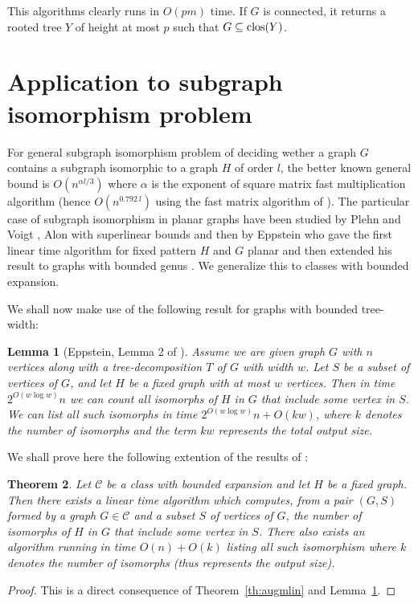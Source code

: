\documentclass[a4paper]{amsart}
\newtheorem{theorem}{Theorem}[section]
\newtheorem{lemma}[theorem]{Lemma}
\theoremstyle{definition}
\theoremstyle{remark}
\DeclareMathOperator\clos{{\rm clos}}
\begin{document}
This algorithms clearly runs in $O(pm)$ time. If $G$ is connected, it
returns a rooted tree $Y$ of height at most $p$ such that $G\subseteq\clos(Y)$.

\section{Application to subgraph isomorphism problem}
For general subgraph isomorphism problem of deciding wether a graph
$G$ contains a subgraph isomorphic to a graph $H$ of order $l$, 
the better known general bound is $O(n^{\alpha l/3})$ where $\alpha$ is
the exponent of square matrix fast multiplication algorithm
\cite{NP85} (hence $O(n^{0.792\ l})$ using the fast matrix algorithm of \cite{coppersmith90}).
 The particular case of
subgraph isomorphism in planar graphs have been studied by Plehn and
Voigt \cite{plehn91}, Alon \cite{alon95} with superlinear bounds and
then by Eppstein \cite{Epp-SODA-95}\cite{Epp-JGAA-99} who gave the
first linear time algorithm for fixed pattern $H$ and $G$ planar and
then extended his result to graphs with bounded genus \cite{Epp-Algo-00}.
We generalize this to classes with bounded expansion.

We shall now make use of the following result for graphs with bounded
tree-width: 

\begin{lemma}[Eppstein, Lemma 2 of \cite{Epp-JGAA-99}]
\label{lem:Epp2}
Assume we are given graph $G$ with $n$ vertices along with a
tree-decomposition $T$ of $G$ with width $w$. Let $S$ be a subset of
vertices of $G$, and let $H$ be a fixed graph with at most $w$
vertices. Then in time $2^{O(w\log w)}n$ we can count all isomorphs of
$H$ in $G$ that include some vertex in $S$. We can list all such
isomorphs in time  $2^{O(w\log w)}n+O(kw)$, where $k$ denotes the
number of isomorphs and the term $kw$ represents the total output
size.
\end{lemma}

We shall prove here the following extention of the results of
\cite{Epp-JGAA-99}\cite{Epp-Algo-00}: 

\begin{theorem}
Let $\mathcal C$ be a class with bounded expansion and let $H$ be a
fixed graph. Then there exists a linear time algorithm
which computes, from a pair $(G,S)$ formed by a graph $G\in\mathcal C$
and a subset $S$ of vertices of $G$, the number of isomorphs of $H$ in
$G$ that include some vertex in $S$. There also exists an algorithm
running in time $O(n)+O(k)$ listing all such isomorphism where  $k$ denotes the
number of isomorphs (thus represents the output size).
\end{theorem}
\begin{proof}
This is a direct consequence of Theorem~\ref{th:augmlin} and
Lemma~\ref{lem:Epp2}.
\end{proof}
\end{document}
